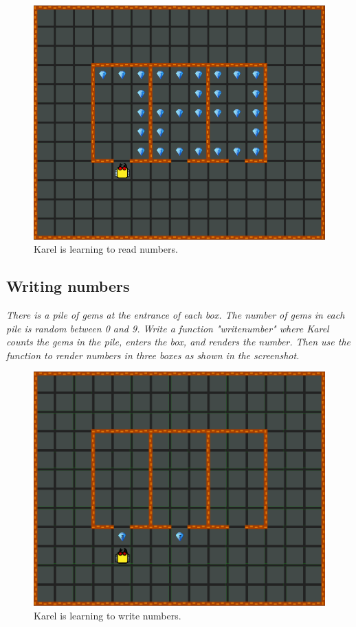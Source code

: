 {{\newpage

\begin{figure}[!ht]
\begin{center}
\includegraphics[height=0.4\textwidth]{img/i01.png}
\end{center}
\vspace{-4mm}
\caption{Karel is learning to read numbers.}
\label{fig:g10}
\end{figure}



\subsection{Writing numbers}

{\em There is a pile of gems at the entrance of each box. The number of gems in each pile is random between 0 and 9. Write a function "writenumber" where Karel counts the gems in the pile, enters the box, and renders the number. Then use the function to render numbers in three boxes as shown in the screenshot. }

\begin{figure}[!ht]
\begin{center}
\includegraphics[height=0.4\textwidth]{img/i02.png}
\end{center}
\vspace{-4mm}
\caption{Karel is learning to write numbers.}
\label{fig:g11}
\vspace{-10mm}
\end{figure}



}}
